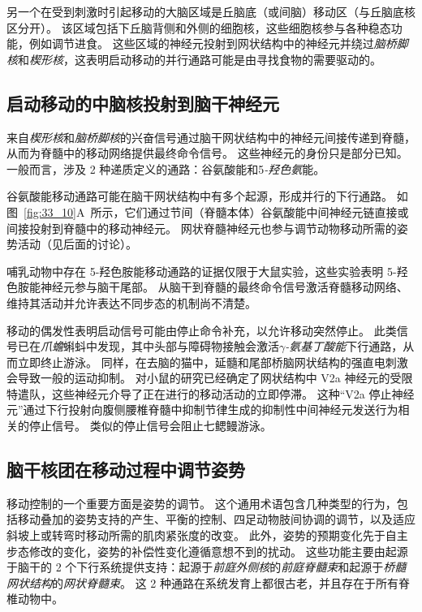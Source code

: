 另一个在受到刺激时引起移动的大脑区域是丘脑底（或间脑）移动区（与丘脑底核区分开）。
该区域包括下丘脑背侧和外侧的细胞核，这些细胞核参与各种稳态功能，例如调节进食。
这些区域的神经元投射到网状结构中的神经元并绕过\textit{脑桥脚核}和\textit{楔形核}，这表明启动移动的并行通路可能是由寻找食物的需要驱动的。



\subsection{启动移动的中脑核投射到脑干神经元}

来自\textit{楔形核}和\textit{脑桥脚核}的兴奋信号通过脑干网状结构中的神经元间接传递到脊髓，从而为脊髓中的移动网络提供最终命令信号。
这些神经元的身份只是部分已知。
一般而言，涉及 2 种递质定义的通路：谷氨酸能和5\textit{-羟色氨}能。


谷氨酸能移动通路可能在脑干网状结构中有多个起源，形成并行的下行通路。
如图~\ref{fig:33_10}A~所示，它们通过节间（脊髓本体）谷氨酸能中间神经元链直接或间接投射到脊髓中的移动神经元。
网状脊髓神经元也参与调节动物移动所需的姿势活动（见后面的讨论）。


哺乳动物中存在 5-羟色胺能移动通路的证据仅限于大鼠实验，这些实验表明 5-羟色胺能神经元参与脑干尾部。
从脑干到脊髓的最终命令信号激活脊髓移动网络、维持其活动并允许表达不同步态的机制尚不清楚。


移动的偶发性表明启动信号可能由停止命令补充，以允许移动突然停止。
此类信号已在\textit{爪蟾}蝌蚪中发现，其中头部与障碍物接触会激活\textit{$\gamma$-氨基丁酸能}下行通路，从而立即终止游泳。
同样，在去脑的猫中，延髓和尾部桥脑网状结构的强直电刺激会导致一般的运动抑制。
对小鼠的研究已经确定了网状结构中 V2a 神经元的受限特遣队，这些神经元介导了正在进行的移动活动的立即停滞。
这种“V2a 停止神经元”通过下行投射向腹侧腰椎脊髓中抑制节律生成的抑制性中间神经元发送行为相关的停止信号。
类似的停止信号会阻止七鳃鳗游泳。



\subsection{脑干核团在移动过程中调节姿势}

移动控制的一个重要方面是姿势的调节。
这个通用术语包含几种类型的行为，包括移动叠加的姿势支持的产生、平衡的控制、四足动物肢间协调的调节，以及适应斜坡上或转弯时移动所需的肌肉紧张度的改变。
此外，姿势的预期变化先于自主步态修改的变化，姿势的补偿性变化遵循意想不到的扰动。
这些功能主要由起源于脑干的 2 个下行系统提供支持：起源于\textit{前庭外侧核}的\textit{前庭脊髓束}和起源于\textit{桥髓网状结构}的\textit{网状脊髓束}。
这 2 种通路在系统发育上都很古老，并且存在于所有脊椎动物中。


